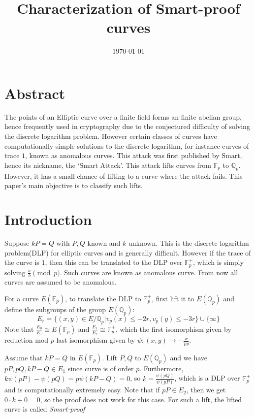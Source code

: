 \documentclass{article}
\title{Characterization of Smart-proof curves}
\date{\today}
\author{}
\newcommand{\mb}
{\mathbb}
\begin{document}
\maketitle
\section*{Abstract}

The points of an Elliptic curve over a finite field forms an finite abelian group, hence frequently used in cryptography due to the conjectured difficulty of solving the discrete logarithm problem. However certain classes of curves have computationally simple solutions to the discrete logarithm, for instance curves of trace $1$, known as anomalous curves. This attack was first published by Smart, hence its nickname, the `Smart Attack'. This attack lifts curves from $\mb F_p$ to $\mb Q_p$. However, it has a small chance of lifting to a curve where the attack fails. This paper's main objective is to classify such lifts.

\section{Introduction}

Suppose $kP=Q$ with $P,Q$ known and $k$ unknown. This is the discrete logarithm problem(DLP) for elliptic curves and is generally difficult. However if the trace of the curve is $1$, then this can be translated to the DLP over $\mb F^+_p$, which is simply solving $\frac ab\pmod p$. Such curves are known as anomalous curve. From now all curves are assumed to be anomalous.

For a curve $E\left(\mb F_p\right)$, to translate the DLP to $\mb F^+_p$, first lift it to $E\left(\mb Q_p\right)$ and define the subgroups of the group $E\left(\mb Q_p\right)$: 
$$E_r=\{(x,y)\in E/\mb Q_p|v_p(x)\leq-2r,v_p(y)\leq-3r\}\cup\{\infty\}$$
Note that $\frac{E_0}{E_1}\cong E\left(\mb F_p\right)$ and $\frac{E_1}{E_2}\cong\mb F_p^+$, which the first isomorphism given by reduction mod $p$ last isomorphism given by $\psi:(x,y)\to -\frac x{py}$.

Assume that $kP=Q$ in $E\left(\mb F_p\right)$. Lift $P,Q$ to $E\left(\mb Q_p\right)$ and we have $pP,pQ,kP-Q\in E_1$ since curve is of order $p$. Furthermore, $k\psi(pP)-\psi(pQ)=p\psi(kP-Q)=0$, so $k=\frac{\psi(pQ)}{\psi(pP)}$, which is a DLP over $\mb F^+_p$ and is computationally extremely easy. Note that if $pP\in E_2$, then we get $0\cdot k+0=0$, so the proof does not work for this case. For such a lift, the lifted curve is called \emph{Smart-proof}
\end{document}
